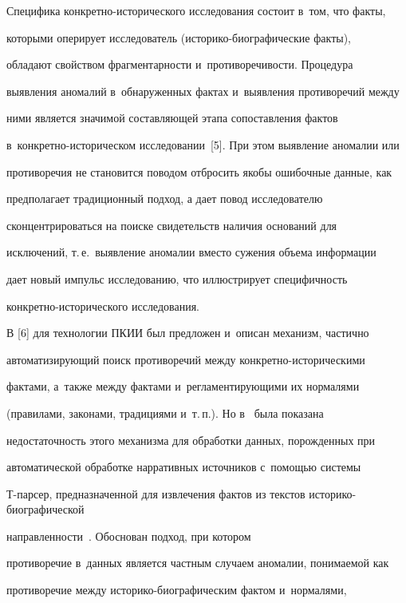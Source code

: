   


  Специфика конкретно-исторического исследования состоит в~том, что факты, 


которыми оперирует исследователь (историко-биографические факты), 


обладают свойством фрагментарности и~противоречивости. Процедура 


выявления аномалий в~обнаруженных фактах и~выявления противоречий между 


ними является значимой составляющей этапа сопоставления фактов 


в~кон\-крет\-но-ис\-то\-ри\-че\-ском исследовании~[5]. При этом выявление аномалии или 


противоречия не становится поводом отбросить якобы ошибочные данные, как 


предполагает традиционный подход, а дает повод исследователю 


сконцентрироваться на поиске свидетельств наличия оснований для 


исключений, т.\,е.\ выявление аномалии вместо сужения объема информации 


дает новый импульс исследованию, что иллюстрирует специфичность 


конкретно-исторического исследования. 


  


  В [6] для технологии ПКИИ был предложен и~описан механизм, частично 


автоматизирующий поиск противоречий между кон\-крет\-но-ис\-то\-ри\-че\-ски\-ми 


фактами, а~также между фактами и~регламентирующими их нормалями 


(правилами, законами, традициями и~т.\,п.). Но в~\cite{7-ad} была показана 


недостаточность этого механизма для обработки данных, порожденных при 


автоматической обработке нарративных источников с~помощью системы  


Т-пар\-сер, предназначенной для извлечения фактов из текстов ис\-то\-ри\-ко-био\-гра\-фи\-че\-ской 


направленности~\cite{8-ad}. Обоснован подход, при котором 


противоречие в~данных является частным случаем аномалии, понимаемой как 


противоречие между ис\-то\-ри\-ко-био\-гра\-фи\-че\-ским фактом и~нормалями, 



